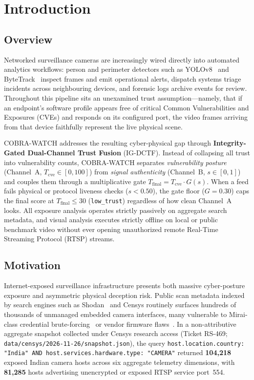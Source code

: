 \documentclass[12pt,a4paper]{article}
\begin{document}
\tableofcontents
\newpage

\section{Introduction}

\subsection{Overview}
Networked surveillance cameras are increasingly wired directly into automated analytics workflows: person and perimeter detectors such as YOLOv8~\cite{jocher2023yolov8} and ByteTrack~\cite{zhang2022bytetrack} inspect frames and emit operational alerts, dispatch systems triage incidents across neighbouring devices, and forensic logs archive events for review. Throughout this pipeline sits an unexamined trust assumption---namely, that if an endpoint's software profile appears free of critical Common Vulnerabilities and Exposures (CVEs) and responds on its configured port, the video frames arriving from that device faithfully represent the live physical scene.

COBRA-WATCH addresses the resulting cyber-physical gap through \textbf{Integrity-Gated Dual-Channel Trust Fusion} (IG-DCTF). Instead of collapsing all trust into vulnerability counts, COBRA-WATCH separates \emph{vulnerability posture} (Channel~A, $T_{\mathrm{cve}} \in [0, 100]$) from \emph{signal authenticity} (Channel~B, $s \in [0, 1]$) and couples them through a multiplicative gate $T_{\mathrm{final}} = T_{\mathrm{cve}} \cdot G(s)$. When a feed fails physical or protocol liveness checks ($s < 0.50$), the gate floor ($G = 0.30$) caps the final score at $T_{\mathrm{final}} \le 30$ (\texttt{low\_trust}) regardless of how clean Channel~A looks. All exposure analysis operates strictly passively on aggregate search metadata, and visual analysis executes strictly offline on local or public benchmark video without ever opening unauthorized remote Real-Time Streaming Protocol (RTSP) streams.

\subsection{Motivation}
Internet-exposed surveillance infrastructure presents both massive cyber-posture exposure and asymmetric physical deception risk. Public scan metadata indexed by search engines such as Shodan~\cite{matherly2015shodan} and Censys routinely surfaces hundreds of thousands of unmanaged embedded camera interfaces, many vulnerable to Mirai-class credential brute-forcing~\cite{antonakakis2017mirai,griffioen2020mirai} or vendor firmware flaws~\cite{das2022kalay}. In a non-attributive aggregate snapshot collected under Censys research access (Ticket RS-469; \texttt{data/censys/2026-11-26/snapshot.json}), the query \texttt{host.location.country: "India" AND host.services.hardware.type: "CAMERA"} returned \textbf{104,218} exposed Indian camera hosts across six aggregate telemetry dimensions, with \textbf{81,285} hosts advertising unencrypted or exposed RTSP service port~554.
\end{document}
